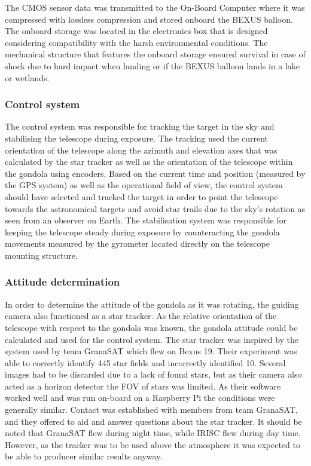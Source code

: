 The CMOS sensor data was transmitted to the On-Board Computer where it was compressed with lossless compression and stored onboard the BEXUS balloon. The onboard storage was located in the electronics box that is designed considering compatibility with the harsh environmental conditions. The mechanical structure that features the onboard storage ensured survival in case of shock due to hard impact when landing or if the BEXUS balloon lands in a lake or wetlands.


\subsubsection{Control system}
The control system was responsible for tracking the target in the sky and stabilising the telescope during exposure. The tracking used the current orientation of the telescope along the azimuth and elevation axes that was calculated by the star tracker as well as the orientation of the telescope within the gondola using encoders. Based on the current time and position (measured by the GPS system) as well as the operational field of view, the control system should have selected and tracked the target in order to point the telescope towards the astronomical targets and avoid star trails due to the sky's rotation as seen from an observer on Earth. The stabilisation system was responsible for keeping the telescope steady during exposure by counteracting the gondola movements measured by the gyrometer located directly on the telescope mounting structure.


\subsubsection{Attitude determination}
\label{sec::4-1_attitude_determination}
In order to determine the attitude of the gondola as it was rotating, the guiding camera also functioned as a star tracker. As the relative orientation of the telescope with respect to the gondola was known, the gondola attitude could be calculated and used for the control system. The star tracker was inspired by the system used by team GranaSAT which flew on Bexus 19. Their experiment was able to correctly identify 445 star fields and incorrectly identified 10. Several images had to be discarded due to a lack of found stars, but as their camera also acted as a horizon detector the FOV of stars was limited. As their software worked well and was run on-board on a Raspberry Pi the conditions were generally similar. Contact was established with members from team GranaSAT, and they offered to aid and answer questions about the star tracker. It should be noted that GranaSAT flew during night time, while IRISC flew during day time. However, as the tracker was to be used above the atmosphere it was expected to be able to producer similar results anyway.

